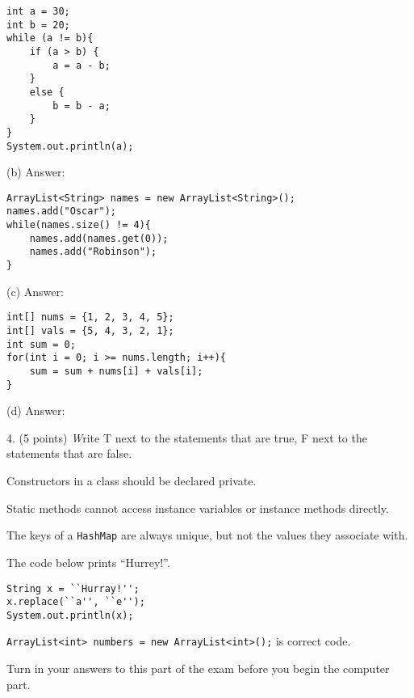 \documentclass[12pt,twoside]{article}
\newcommand{\fillInBlank}[1][0.5in]{\underline{\hspace{#1}}}
\newcommand{\code}[1]{\texttt{#1}}
\begin{document}
\hfill
\begin{minipage}{0.58\linewidth}
\begin{lstlisting}
int a = 30;
int b = 20;
while (a != b){ 
    if (a > b) {
    	a = a - b; 
    }
    else {
    	b = b - a;
    }
}
System.out.println(a);
\end{lstlisting}
\end{minipage}
\hspace{0.25in}
\begin{minipage}[t]{0.25\linewidth}
(b) Answer: \fillInBlank
\end{minipage}
\vfill

\hfill
\begin{minipage}{0.58\linewidth}
\begin{lstlisting}
ArrayList<String> names = new ArrayList<String>();
names.add("Oscar");
while(names.size() != 4){
	names.add(names.get(0));
	names.add("Robinson");
}
\end{lstlisting}
\end{minipage}
\hspace{0.25in}
\begin{minipage}[t]{0.25\linewidth}
(c) Answer: \fillInBlank
\end{minipage}
\vfill

\hfill
\begin{minipage}{0.58\linewidth}
\begin{lstlisting}
int[] nums = {1, 2, 3, 4, 5};
int[] vals = {5, 4, 3, 2, 1};
int sum = 0;
for(int i = 0; i >= nums.length; i++){
	sum = sum + nums[i] + vals[i];
}
\end{lstlisting}
\end{minipage}
\hspace{0.25in}
\begin{minipage}[t]{0.25\linewidth}
(d) Answer: \fillInBlank
\end{minipage}
\vfill

\clearpage

4. (5 points) {\emph Write T next to the statements that are true, F next to the statements that are false. }

  \fillInBlank Constructors in a class should be declared private.
 
  \fillInBlank Static methods cannot access instance variables or instance methods directly.

  \fillInBlank The keys of a \code{HashMap} are always unique, but not the values they associate with.
    
\fillInBlank The code below prints ``Hurrey!''. 
\begin{lstlisting}
String x = ``Hurray!'';
x.replace(``a'', ``e'');
System.out.println(x);
\end{lstlisting}

\fillInBlank \code{ArrayList<int> numbers = new ArrayList<int>();}  is correct code.



\vfill
\vfill

\begin{center}
{\Large Turn in your answers to this part of the exam before you begin the computer part.}
\end{center}
\end{document}
